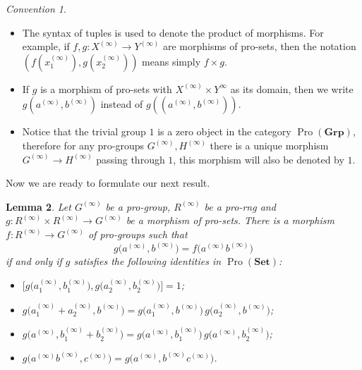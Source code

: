 \documentclass[oneside, 11pt]{amsart}
\numberwithin{equation}{section}
\newtheorem{lemma}{Lemma} \numberwithin{lemma}{section}
\theoremstyle{definition}
\theoremstyle{remark}
\newtheorem{conv}[lemma]{Convention} \Crefname{conv}{Convention}{Conventions}
\DeclareMathOperator{\Pro}{Pro}
\newcommand{\Set}{\mathbf{Set}}
\newcommand{\Group}{\mathbf{Grp}}
\begin{document}
\begin{conv}
\begin{itemize}
  \item The syntax of tuples is used to denote the product of morphisms. For example, if $f,g \colon X^{(\infty)} \to Y^{(\infty)}$ are morphisms of pro-sets, then the notation $(f(x_1^{(\infty)}), g(x_2^{(\infty)}))$ means simply $f\times g$.
  \item If $g$ is a morphism of pro-sets with $X^{(\infty)} \times Y^{\infty}$ as its domain, then we write $g(a^{(\infty)}, b^{(\infty)})$ instead of $g((a^{(\infty)}, b^{(\infty)}))$.
  \item Notice that the trivial group $1$ is a zero object in the category $\Pro(\Group)$, therefore for any pro-groups $G^{(\infty)}, H^{(\infty)}$ there is a unique morphism $G^{(\infty)} \to H^{(\infty)}$ passing through $1$, this morphism will also be denoted by $1$.
 \end{itemize}
\end{conv} 
Now we are ready to formulate our next result.
\begin{lemma}\label{RingPresentation}
Let \(G^{(\infty)}\) be a pro-group, $R^{(\infty)}$ be a pro-rng and \(g \colon R^{(\infty)} \times R^{(\infty)} \to G^{(\infty)}\) be a morphism of pro-sets. There is a morphism \(f \colon R^{(\infty)} \to G^{(\infty)}\) of pro-groups such that
\[g\bigl(a^{(\infty)} , b^{(\infty)}\bigr) = f\bigl(a^{(\infty)} b^{(\infty)}\bigr)\]
if and only if \(g\) satisfies the following identities in $\Pro(\Set)$:
\begin{itemize}
\item \(\bigl[g\bigl(a_1^{(\infty)}, b_1^{(\infty)}\bigr), g\bigl(a_2^{(\infty)}, b_2^{(\infty)}\bigr)\bigr] = 1\);
\item \(g\bigl(a_1^{(\infty)} + a_2^{(\infty)}, b^{(\infty)}\bigr) = g\bigl(a_1^{(\infty)}, b^{(\infty)}\bigr)\, g\bigl(a_2^{(\infty)}, b^{(\infty)}\bigr)\);
\item \(g\bigl(a^{(\infty)}, b_1^{(\infty)} + b_2^{(\infty)}\bigr) = g\bigl(a^{(\infty)}, b_1^{(\infty)}\bigr)\, g\bigl(a^{(\infty)}, b_2^{(\infty)}\bigr)\);
\item \(g\bigl(a^{(\infty)} b^{(\infty)}, c^{(\infty)}\bigr) = g\bigl(a^{(\infty)}, b^{(\infty)} c^{(\infty)}\bigr)\).
\end{itemize}
\end{lemma}
\end{document}
